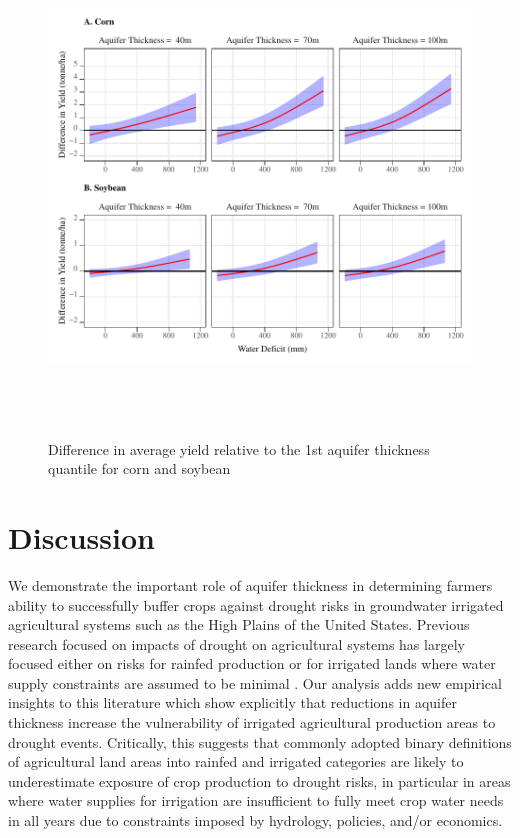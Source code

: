 \documentclass[
]{article}
\begin{document}
\begin{figure}[H]

{\centering \includegraphics[width=6in,height=500px,]{Figures/g_avg_yield_dif} 

}

\caption{Difference in average yield relative to the 1st aquifer thickness quantile for corn and soybean}\label{fig:dif-tot-impact}
\end{figure}

\clearpage

\hypertarget{discussion}{%
\section{Discussion}\label{discussion}}

We demonstrate the important role of aquifer thickness in determining farmers ability to successfully buffer crops against drought risks in groundwater irrigated agricultural systems such as the High Plains of the United States. Previous research focused on impacts of drought on agricultural systems has largely focused either on risks for rainfed production \citep{schlenker2009nonlinear, lobell2014greater, schlenker2010robust, zhou2020connections, borgomeo2020impact} or for irrigated lands where water supply constraints are assumed to be minimal \citep{kuwayama2019estimating, zipper2016drought, zhu2022untangling, zhu2022warming, lu2020mapping, davis2019sensitivity, li2018changes, luan2021combined}. Our analysis adds new empirical insights to this literature which show explicitly that reductions in aquifer thickness increase the vulnerability of irrigated agricultural production areas to drought events. Critically, this suggests that commonly adopted binary definitions of agricultural land areas into rainfed and irrigated categories are likely to underestimate exposure of crop production to drought risks, in particular in areas where water supplies for irrigation are insufficient to fully meet crop water needs in all years due to constraints imposed by hydrology, policies, and/or economics.
\end{document}
